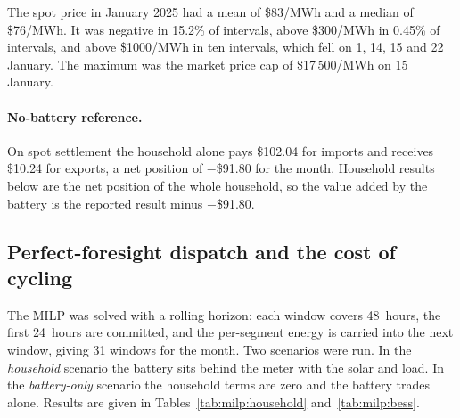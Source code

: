 The spot price in January 2025 had a mean of \$83/MWh and a median of \$76/MWh. It was
negative in 15.2\% of intervals, above \$300/MWh in 0.45\% of intervals, and above
\$1000/MWh in ten intervals, which fell on 1, 14, 15 and 22 January. The maximum was the
market price cap of \$17\,500/MWh on 15 January.

\paragraph{No-battery reference.}
On spot settlement the household alone pays \$102.04 for imports and receives \$10.24 for
exports, a net position of $-$\$91.80 for the month. Household results below are the
net position of the whole household, so the value added by the battery is the reported
result minus $-$\$91.80.

\subsection{Perfect-foresight dispatch and the cost of cycling}
\label{sec:results:milp}

The MILP was solved with a rolling horizon: each window covers 48~hours, the first
24~hours are committed, and the per-segment energy is carried into the next window,
giving 31 windows for the month. Two scenarios were run. In the \emph{household}
scenario the battery sits behind the meter with the solar and load. In the
\emph{battery-only} scenario the household terms are zero and the battery trades alone.
Results are given in Tables~\ref{tab:milp:household} and~\ref{tab:milp:bess}.

